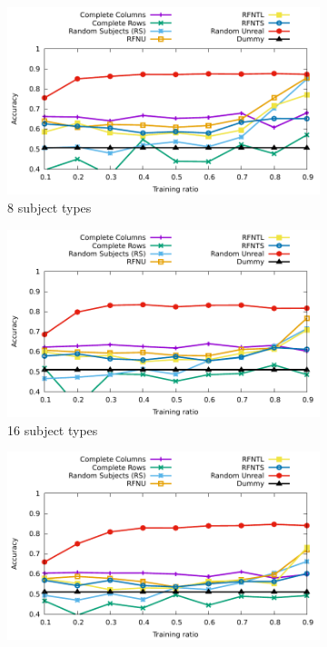 \documentclass[10pt, conference, compsocconf]{IEEEtran}
\begin{document}
\begin{figure}
\begin{subfigure}[b]{\columnwidth}
        \includegraphics[width=0.8\columnwidth]{data/results/means_of_results/ALS-Bias/Synthetic/synthetic_subject_types/ALS-Bias-8-types.pdf}
        \caption{8 subject types}
\end{subfigure}
\begin{subfigure}[b]{\columnwidth}
        \includegraphics[width=0.8\columnwidth]{data/results/means_of_results/ALS-Bias/Synthetic/synthetic_subject_types/ALS-Bias-16-types.pdf}
        \caption{16 subject types}
\end{subfigure}
\begin{subfigure}[b]{\columnwidth}
        \includegraphics[width=0.8\columnwidth]{data/results/means_of_results/ALS-Bias/Synthetic/synthetic_subject_types/ALS-Bias-32-types.pdf}

\end{subfigure}
\end{figure}
\end{document}

